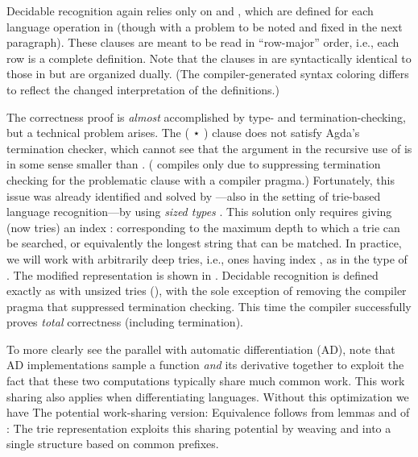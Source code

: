 \documentclass[acmsmall,screen,timestamp,anonymous,review]{acmart}
\begin{document}
Decidable recognition again relies only on  and , which are defined for each language operation in  (though with a problem to be noted and fixed in the next paragraph).
These clauses are meant to be read in ``row-major'' order, i.e., each row is a complete definition.
Note that the clauses in  are syntactically identical to those in  but are organized dually.
(The compiler-generated syntax coloring differs to reflect the changed interpretation of the definitions.)

The correctness proof is \emph{almost} accomplished by type- and termination-checking, but a technical problem arises.
The { ( \AF ⋆ )} clause does not satisfy Agda's termination checker, which cannot see that the argument {  } in the recursive use of  is in some sense smaller than .
( compiles only due to suppressing termination checking for the problematic clause with a compiler pragma.)
Fortunately, this issue was already identified and solved by \citet{Abel2016}---also in the setting of trie-based language recognition---by using \emph{sized types} \citep{Abel2008, AbelPientka2016}.
\rnc{}
This solution only requires giving  (now tries) an index { \AK : } corresponding to the maximum depth to which a trie can be searched, or equivalently the longest string that can be matched.
In practice, we will work with arbitrarily deep tries, i.e., ones having index , as in the type of {}.
The modified representation is shown in .
Decidable recognition is defined exactly as with unsized tries (), with the sole exception of removing the compiler pragma that suppressed termination checking.
This time the compiler successfully proves \emph{total} correctness (including termination).

\rnc{}

To more clearly see the parallel with automatic differentiation (AD), note that AD implementations sample a function \emph{and} its derivative together to exploit the fact that these two computations typically share much common work.
This work sharing also applies when differentiating languages.
Without this optimization we have
The potential work-sharing version:
Equivalence follows from lemmas  and  of :
The trie representation exploits this sharing potential by weaving  and  into a single structure based on common prefixes.
\end{document}
